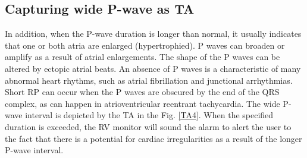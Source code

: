 \subsection{Capturing wide P-wave as TA}

In addition, when the P-wave duration is longer than normal, it
usually indicates that one or both atria are enlarged (hypertrophied).
P waves can broaden or amplify as a result of atrial enlargements.
The shape of the P waves can be altered by ectopic atrial beats.
An absence of P waves is a characteristic of many abnormal heart
rhythms, such as atrial fibrillation and junctional arrhythmias. Short
RP can occur when the P waves are obscured by the end of the QRS
complex, as can happen in atrioventricular reentrant tachycardia.
The wide P-wave interval is depicted by the TA in the Fig. \ref{TA4}. When
the specified duration is exceeded, the RV monitor will sound the
alarm to alert the user to the fact that there is a potential for cardiac
irregularities as a result of the longer P-wave interval.

